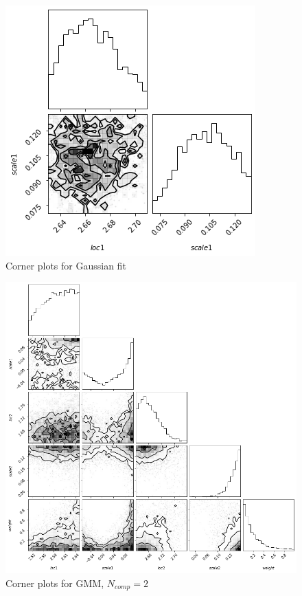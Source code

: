 \documentclass[journal,12pt,twocolumn]{IEEEtran}
\begin{document}
\begin{figure}[ht!]
\centering
\includegraphics{fig/bay_evi_gau.png}
\caption{Corner plots for Gaussian fit}
\end{figure}
\begin{figure}[ht!]
\centering
\includegraphics[width=\textwidth]{fig/bay_evi_gmm2.png}
\caption{Corner plots for GMM, $N_{comp}=2$}
\end{figure}
\end{document}
